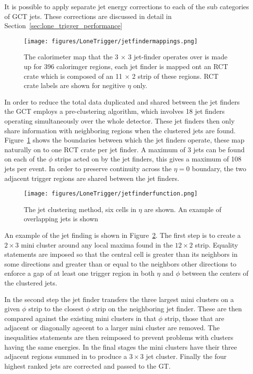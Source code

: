 It is possible to apply separate jet energy corrections to each of the sub 
categories of GCT jets. These corrections are discussed in detail in 
Section~\ref{sec:lone_trigger_performance}

\begin{figure}[ht]
  \centering    
  \texttt{[image: figures/LoneTrigger/jetfindermappings.png]}
  \caption{The calorimeter map that the 3 $\times$ 3 jet-finder operates over
   is made up for 396 calorimger regions, each jet finder is mapped ont an RCT
    crate which is composed of an 11 $\times$ 2 strip of these regions. RCT
    crate labels are shown for negitive $\eta$ only. }
  \label{fig:figures_LoneTrigger_jetfindermappings}
\end{figure}

In order to reduce the total data duplicated and shared between the jet finders
the GCT employs a pre-clustering algorithm, which involves 18 jet finders 
operating simultaneously over the whole detector. These jet finders then only
share information with neighboring regions when the clustered jets are found.
Figure~\ref{fig:figures_LoneTrigger_jetfindermappings} shows the boundaries 
between which the jet finders operate, these map naturally on to one RCT crate 
per jet finder. A maximum of 3 jets can be found on each of the $\phi$ strips
acted on by the jet finders, this gives a maximum of 108 jets per event. In
order to preserve continuity across the $\eta = 0$ boundary, the two adjacent
trigger regions are shared between the jet finders.


\begin{figure}[ht]
  \centering
 \texttt{[image: figures/LoneTrigger/jetfinderfunction.png]}
  \caption{The \Lone jet clustering method, six cells in $\eta$ are shown. An
  example of overlapping jets is shown}
  \label{fig:figures_LoneTrigger_jetfinderfunction}
\end{figure}


An example of the jet finding is shown in
Figure~\ref{fig:figures_LoneTrigger_jetfinderfunction}. The first step is to 
create a $2 \times 3$ mini cluster around any local maxima found in the $12 
\times 2$ strip. Equality statements are imposed so that the central cell is 
greater than its neighbors in some directions and greater than or equal to the 
neighbors other directions to enforce a gap of at least one trigger region in 
both $\eta$ and $\phi$ between the centers of the clustered jets.

In the second step the jet finder transfers the three largest mini clusters on 
a given $\phi$ strip to the closest $\phi$ strip on the neighboring jet finder.
These are then compared against the existing mini clusters in that $\phi$ strip,
those that are adjacent or diagonally agecent to a larger mini cluster are 
removed. The inequalities statements are then reimposed to prevent problems
with clusters having the same energies. In the final stages the mini clusters
have their three adjacent regions summed in to produce a $3 \times 3$ jet
cluster. Finally the four highest ranked jets are corrected and passed to the 
GT.

